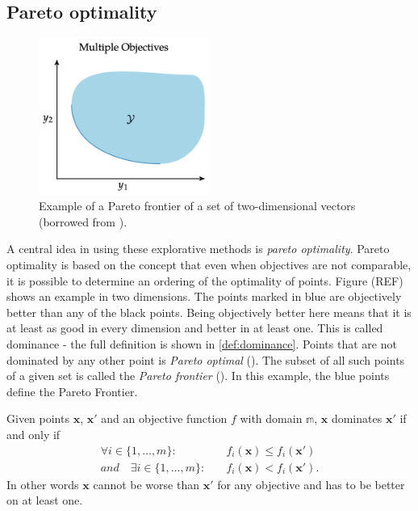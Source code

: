 \subsection{Pareto optimality}
\begin{figure}
	\centering
	\includegraphics[width=0.5\textwidth]{figures/pareto}
	\caption{Example of a Pareto frontier of a set of two-dimensional vectors (borrowed from \cite[213]{kochenderfer2019algorithms}).}\label{fig:pareto}
\end{figure}
A central idea in using these explorative methods is \textit{pareto optimality}. Pareto optimality is based on the concept that even when objectives are not comparable, it is possible to determine an ordering of the optimality of points. Figure (REF) shows an example in two dimensions. The points marked in blue are objectively better than any of the black points. Being objectively better here means that it is at least as good in every dimension and better in at least one. This is called dominance - the full definition is shown in \cref{def:dominance}. Points that are not dominated by any other point is \textit{Pareto optimal} (). The subset of all such points of a given set is called the \textit{Pareto frontier} (). In this example, the blue points define the Pareto Frontier.

\begin{definition}[Dominance]\label{def:dominance}
Given points $\mathbf{x}$, $\mathbf{x'}$ and an objective function $f$ with domain $\mathbb{m}$, $\mathbf{x}$ dominates $\mathbf{x'}$ if and only if
\begin{align}
 \forall i \in \{1, \dots, m\} :&\quad f_i(\mathbf{x})\leq f_i(\mathbf{x'}) \\
and \quad \exists i \in \{1, \dots, m\} :&\quad f_i(\mathbf{x}) < f_i(\mathbf{x'}).
\end{align}
In other words $\mathbf{x}$ cannot be worse than $\mathbf{x'}$ for any objective and has to be better on at least one.
\end{definition}

